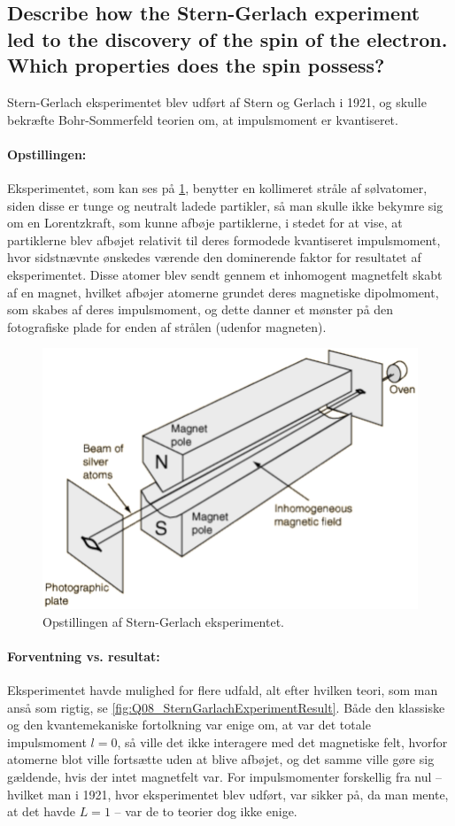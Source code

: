 \subsection{Describe how the Stern-Gerlach experiment led to the discovery of the spin of the electron. Which properties does the spin possess?}


Stern-Gerlach eksperimentet blev udført af Stern og Gerlach i 1921, og skulle bekræfte Bohr-Sommerfeld teorien om, at impulsmoment er kvantiseret.

\paragraph{Opstillingen:} Eksperimentet, som kan ses på \cref{fig:Q08_SternGerlachEksperimentOpstilling}, benytter en kollimeret stråle af sølvatomer, siden disse er tunge og neutralt ladede partikler, så man skulle ikke bekymre sig om en Lorentzkraft, som kunne afbøje partiklerne, i stedet for at vise, at partiklerne blev afbøjet relativit til deres formodede kvantiseret impulsmoment, hvor sidstnævnte ønskedes værende den dominerende faktor for resultatet af eksperimentet. Disse atomer blev sendt gennem et inhomogent magnetfelt skabt af en magnet, hvilket afbøjer atomerne grundet deres magnetiske dipolmoment, som skabes af deres impulsmoment, og dette danner et mønster på den fotografiske plade for enden af strålen (udenfor magneten).

\begin{figure}[!h]
    \centering
    \includegraphics[width = .75\textwidth]{Q08/images/SternGerlachExperiment.PNG}
    \caption{Opstillingen af Stern-Gerlach eksperimentet.}
    \label{fig:Q08_SternGerlachEksperimentOpstilling}
\end{figure}

\paragraph{Forventning vs. resultat:} Eksperimentet havde mulighed for flere udfald, alt efter hvilken teori, som man anså som rigtig, se \cref{fig:Q08_SternGarlachExperimentResult}. Både den klassiske og den kvantemekaniske fortolkning var enige om, at var det totale impulsmoment $l = 0$, så ville det ikke interagere med det magnetiske felt, hvorfor atomerne blot ville fortsætte uden at blive afbøjet, og det samme ville gøre sig gældende, hvis der intet magnetfelt var. For impulsmomenter forskellig fra nul -- hvilket man i 1921, hvor eksperimentet blev udført, var sikker på, da man mente, at det havde $L = 1$ -- var de to teorier dog ikke enige.

